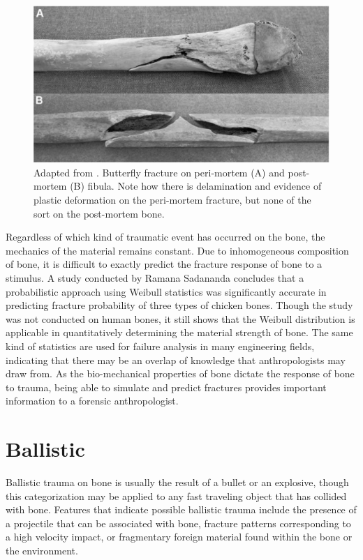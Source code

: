 \documentclass[titlepage]{article}
\begin{document}
\begin{figure}[h!]
\centering
\includegraphics[width=.7\linewidth]{fracture}
\caption{Adapted from \cite{blunt-trauma}. Butterfly fracture on peri-mortem (A) and post-mortem (B) fibula. Note how there is delamination and evidence of plastic deformation on the peri-mortem fracture, but none of the sort on the post-mortem bone.}
\label{fig:fracture}
\end{figure}

Regardless of which kind of traumatic event has occurred on the bone, the mechanics of the material remains constant. Due to inhomogeneous composition of bone, it is difficult to exactly predict the fracture response of bone to a stimulus. A study conducted by Ramana Sadananda concludes that a probabilistic approach using Weibull statistics was significantly accurate in predicting fracture probability of three types of chicken bones.\cite{fracture-analysis} Though the study was not conducted on human bones, it still shows that the Weibull distribution is applicable in quantitatively determining the material strength of bone. The same kind of statistics are used for failure analysis in many engineering fields, indicating that there may be an overlap of knowledge that anthropologists may draw from. As the bio-mechanical properties of bone dictate the response of bone to trauma, being able to simulate and predict fractures provides important information to a forensic anthropologist.

\section{Ballistic}
Ballistic trauma on bone is usually the result of a bullet or an explosive, though this categorization may be applied to any fast traveling object that has collided with bone. Features that indicate possible ballistic trauma include the presence of a projectile that can be associated with bone, fracture patterns corresponding to a high velocity impact, or fragmentary foreign material found within the bone or the environment.\cite{trauma}
\end{document}
